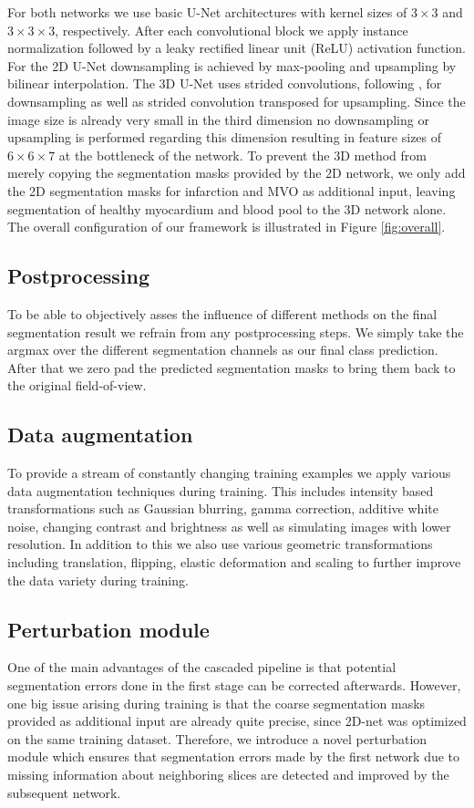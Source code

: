 \documentclass[preprint,5p,authoryear]{elsarticle}
\begin{document}
For both networks we use basic U-Net architectures \citep{ronneberger2015u} with kernel sizes of $3 \times 3$ and $3 \times 3 \times 3$, respectively. After each convolutional block we apply instance normalization followed by a leaky rectified linear unit (ReLU) activation function. For the 2D U-Net downsampling is achieved by max-pooling and upsampling by bilinear interpolation. The 3D U-Net uses strided convolutions, following \cite{szegedy2016rethinking}, for downsampling as well as strided convolution transposed for upsampling. Since the image size is already very small in the third dimension no downsampling or upsampling is performed regarding this dimension resulting in feature sizes of $6 \times 6 \times 7$ at the bottleneck of the network. To prevent the 3D method from merely copying the segmentation masks provided by the 2D network, we only add the 2D segmentation masks for infarction and MVO as additional input, leaving segmentation of healthy myocardium and blood pool to the 3D network alone. The overall configuration of our framework is illustrated in Figure \ref{fig:overall}. 



\subsection{Postprocessing}
To be able to objectively asses the influence of different methods on the final segmentation result we refrain from any postprocessing steps. We simply take the argmax over the different segmentation channels as our final class prediction. After that we zero pad the predicted segmentation masks to bring them back to the original field-of-view. 



\subsection{Data augmentation}
To provide a stream of constantly changing training examples we apply various data augmentation techniques during training. This includes intensity based transformations such as Gaussian blurring, gamma correction, additive white noise, changing contrast and brightness as well as simulating images with lower resolution. In addition to this we also use various geometric transformations including translation, flipping, elastic deformation and scaling to further improve the data variety during training. 

\subsection{Perturbation module}
One of the main advantages of the cascaded pipeline is that potential segmentation errors done in the first stage can be corrected afterwards. However, one big issue arising during training is that the coarse segmentation masks provided as additional input are already quite precise, since 2D-net was optimized on the same training dataset. Therefore, we introduce a novel perturbation module which ensures that segmentation errors made by the first network due to missing information about neighboring slices are detected and improved by the subsequent network. 
\end{document}
